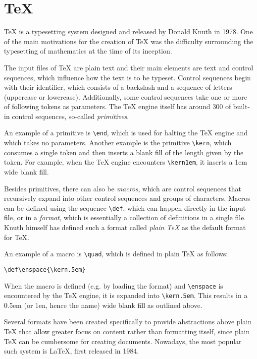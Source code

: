 \documentclass[
  digital,     %
  oneside,     %
  nosansbold,  %
  nocolorbold, %
  lof,         %
  nolot,       %
]{fithesis4}
\newcommand\macro[1]{\texttt{\textbackslash{}{#1}}}
\begin{document}
\section{\TeX{}}
\TeX{} is a typesetting system designed and released by Donald Knuth in 1978. One of the main motivations for the creation of \TeX{} was the difficulty surrounding the typesetting of mathematics at the time of its inception.

The input files of \TeX{} are plain text and their main elements are text and control sequences, which influence how the text is to be typeset. Control sequences begin with their identifier, which consists of a backslash and a sequence of letters (uppercase or lowercase). Additionally, some control sequences take one or more of following tokens as parameters. The \TeX{} engine itself has around 300 of built-in control sequences, so-called \textit{primitives}.

An example of a primitive is \macro{end}, which is used for halting the \TeX{} engine and which takes no parameters. Another example is the primitive \macro{kern}, which consumes a single token and then inserts a blank fill of the length given by the token. For example, when the \TeX{} engine encounters \macro{kern1em}, it inserts a 1em wide blank fill.

Besides primitives, there can also be \textit{macros}, which are control sequences that recursively expand into other control sequences and groups of characters. Macros can be defined using the sequence \macro{def}, which can happen directly in the input file, or in a \textit{format}, which is essentially a collection of definitions in a single file. Knuth himself has defined such a format called \textit{plain \TeX{}} as the default format for \TeX{}.

An example of a macro is \macro{quad}, which is defined in plain \TeX{} as follows:

\noindent
\lstset{language=[plain]TeX}
\begin{lstlisting}
\def\enspace{\kern.5em}
\end{lstlisting}

When the macro is defined (e.g. by loading the format) and \macro{enspace} is encountered by the \TeX{} engine, it is expanded into \macro{kern.5em}. This results in a 0.5em (or 1en, hence the name) wide blank fill as outlined above.

Several formats have been created specifically to provide abstractions above plain \TeX{} that allow greater focus on content rather than formatting itself, since plain \TeX{} can be cumbersome for creating documents. Nowadays, the most popular such system is \LaTeX{}, first released in 1984.
\end{document}
